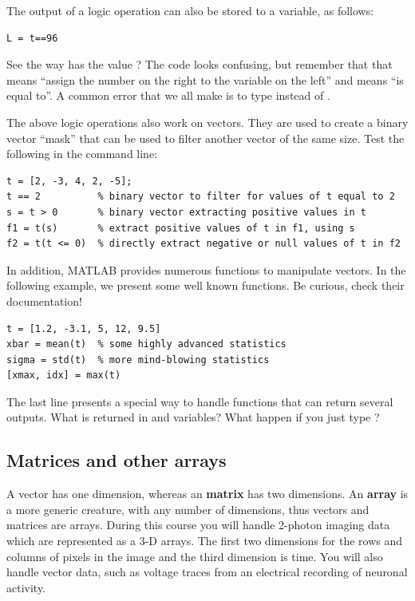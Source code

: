 \documentclass{article}
\begin{document}
The output of a logic operation can also be stored to a variable, as follows:

\begin{lstlisting}
L = t==96
\end{lstlisting}

See the way  has the value ?
The code looks confusing, but remember that that \mcode{=} means ``assign the number on the right to the variable on the left'' and \mcode{==} means ``is equal to''.
A common error that we all make is to type  instead of .

The above logic operations also work on vectors.
They are used to create a binary vector ``mask'' that can be used to filter another vector of the same size.
Test the following in the command line:
\begin{lstlisting}
t = [2, -3, 4, 2, -5];
t == 2          % binary vector to filter for values of t equal to 2
s = t > 0       % binary vector extracting positive values in t
f1 = t(s)       % extract positive values of t in f1, using s
f2 = t(t <= 0)  % directly extract negative or null values of t in f2
\end{lstlisting}

In addition,  MATLAB provides numerous functions to manipulate vectors.
In the following example, we present some well known functions.
Be curious, check their documentation!
\begin{lstlisting}
t = [1.2, -3.1, 5, 12, 9.5]
xbar = mean(t)  % some highly advanced statistics
sigma = std(t)  % more mind-blowing statistics
[xmax, idx] = max(t)
\end{lstlisting}
The last line presents a special way to handle functions that can return several outputs.
What is returned in  and  variables?
What happen if you just type ?


\subsection{Matrices and other arrays}

A vector has one dimension, whereas an \textbf{matrix} has two dimensions.
An \textbf{array} is a more generic creature, with any number of dimensions, thus vectors and matrices are arrays.
During this course you will handle 2-photon imaging data which are represented as a 3-D arrays.
The first two dimensions for the rows and columns of pixels in the image and the third dimension is time.
You will also handle vector data, such as voltage traces from an electrical recording of neuronal activity.
\end{document}
